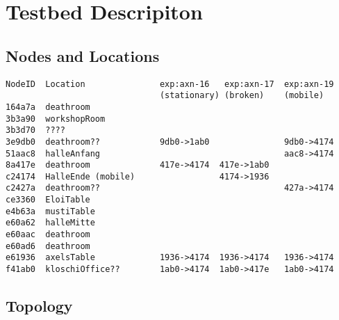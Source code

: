 \documentclass[a4paper,12pt,twoside]{article}
\begin{document}
\section{Testbed Descripiton}

\subsection{Nodes and Locations}


\scriptsize
\begin{verbatim}
NodeID  Location               exp:axn-16   exp:axn-17  exp:axn-19
                               (stationary) (broken)    (mobile)
164a7a  deathroom
3b3a90  workshopRoom
3b3d70  ????
3e9db0  deathroom??            9db0->1ab0               9db0->4174
51aac8  halleAnfang                                     aac8->4174
8a417e  deathroom              417e->4174  417e->1ab0 
c24174  HalleEnde (mobile)                 4174->1936 
c2427a  deathroom??                                     427a->4174
ce3360  EloiTable
e4b63a  mustiTable
e60a62  halleMitte
e60aac  deathroom
e60ad6  deathroom
e61936  axelsTable             1936->4174  1936->4174   1936->4174
f41ab0  kloschiOffice??        1ab0->4174  1ab0->417e   1ab0->4174
\end{verbatim}
\normalsize


\subsection{Topology}





%
\end{document}
